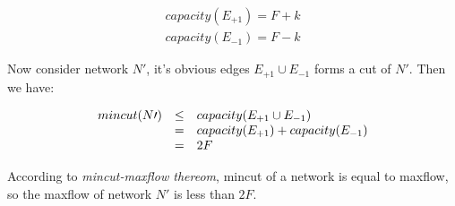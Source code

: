 \[
  \begin{array}{c}
    capacity(E_{+1}) = F + k \\
    capacity(E_{-1}) = F - k
  \end{array}
\]

Now consider network $N\prime$, it's obvious edges $E_{+1} \cup E_{-1}$ forms a cut of $N\prime$. Then we have:

\[
  \begin{array}{l l l}
    mincut(N\prime) & \leq & capacity(E_{+1} \cup E_{-1}) \\
                    & =    & capacity(E_{+1}) + capacity(E_{-1}) \\
                    & =    & 2F
  \end{array}
\]

According to \textit{mincut-maxflow thereom}, mincut of a network is equal to maxflow, so the maxflow of network $N\prime$ is less than $2F$.
